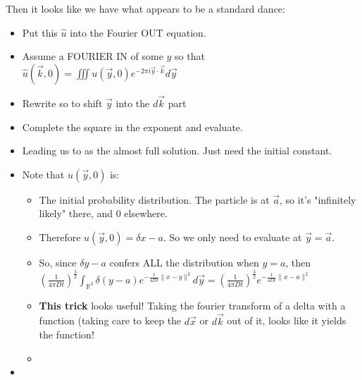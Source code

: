 \documentclass[11pt, oneside]{article}   	%
\begin{document}
\begin{itemize}
Then it looks like we have what appears to be a standard dance:
\begin{itemize}
\item Put this $\hat{u}$ into the Fourier OUT equation.
\item Assume a FOURIER IN of some $y$ so that  $\hat{u}(\vec{k}, 0) = \iiint u(\vec{y}, 0)e^{-2\pi i \vec{y} \cdot \vec{k}} d\vec{y}$
\item Rewrite so to shift $\vec{y}$ into the $d\vec{k}$ part
\item Complete the square in the exponent and evaluate.
\item Leading us to  as the almost full solution.  Just need the initial constant.
\item Note that $u(\vec{y}, 0)$ is:
\begin{itemize}
\item The initial probability distribution.  The particle is at $\vec{a}$, so it's "infinitely likely" there, and 0 elsewhere.
\item Therefore $u(\vec{y}, 0) = \delta{x-a}$.  So we only need to evaluate at $\vec{y} = \vec{a}$.
\item So, since $\delta{y-a}$ confers ALL the distribution when $y=a$, then $(\frac{1}{4 \pi D t})^{\frac{3}{2}} \int_{\mathbb{R}^3}\delta(y-a)e^{-\frac{1}{4 Dt} \| x - y\|^2}d\vec{y} = (\frac{1}{4 \pi D t})^{\frac{3}{2}} e^{-\frac{1}{4 Dt} \| x - a\|^2}$
\item \textbf{This trick} looks useful!  Taking the fourier transform of a delta with a function (taking care to keep the $d\vec{x}$ or $d\vec{k}$ out of it, looks like it yields the function!
\item 

\end{itemize}
\item 
\end{itemize}

\end{itemize}
\end{document}
